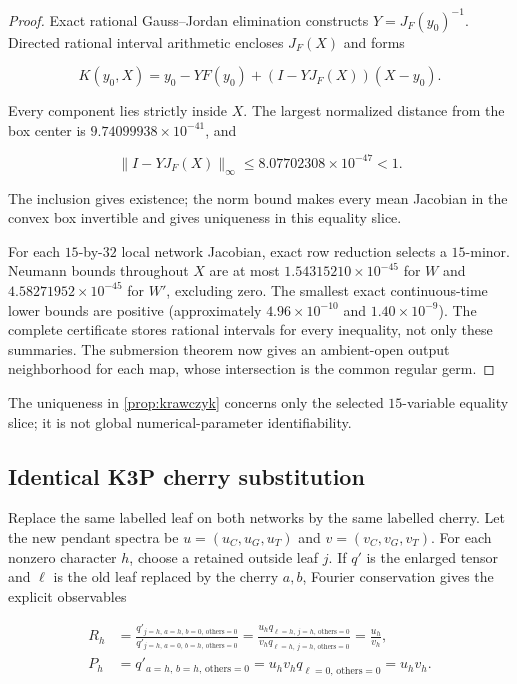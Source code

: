 \begin{proof}
Exact rational Gauss--Jordan elimination constructs
\(Y=J_F(y_0)^{-1}\).  Directed rational interval arithmetic encloses
\(J_F(X)\) and forms

\[
 K(y_0,X)=y_0-YF(y_0)+(I-YJ_F(X))(X-y_0).
\]

Every component lies strictly inside \(X\).  The largest normalized distance
from the box center is \(9.74099938\times10^{-41}\), and

\[
 \lVert I-YJ_F(X)\rVert_\infty
 \le8.07702308\times10^{-47}<1.
\]

The inclusion gives existence; the norm bound makes every mean Jacobian in
the convex box invertible and gives uniqueness in this equality slice.

For each \(15\)-by-\(32\) local network Jacobian, exact row reduction selects
a \(15\)-minor.  Neumann bounds throughout \(X\) are at most
\(1.54315210\times10^{-45}\) for \(W\) and
\(4.58271952\times10^{-45}\) for \(W'\), excluding zero.  The smallest exact
continuous-time lower bounds are positive (approximately
\(4.96\times10^{-10}\) and \(1.40\times10^{-9}\)).  The complete certificate
stores rational intervals for every inequality, not only these summaries.
The submersion theorem now gives an ambient-open output neighborhood for each
map, whose intersection is the common regular germ.
\end{proof}

The uniqueness in \cref{prop:krawczyk} concerns only the selected
\(15\)-variable equality slice; it is not global numerical-parameter
identifiability.

\subsection{Identical K3P cherry substitution}

Replace the same labelled leaf on both networks by the same labelled cherry.
Let the new pendant spectra be
\(u=(u_C,u_G,u_T)\) and \(v=(v_C,v_G,v_T)\).  For each nonzero character \(h\),
choose a retained outside leaf \(j\).  If \(q'\) is the enlarged tensor
and \(\ell\) is the old leaf replaced by the cherry \(a,b\), Fourier
conservation gives the explicit observables

\[
\begin{aligned}
R_h&=
\frac{q'_{j=h,\,a=h,\,b=0,\,\mathrm{others}=0}}
     {q'_{j=h,\,a=0,\,b=h,\,\mathrm{others}=0}}
=\frac{u_hq_{\ell=h,\,j=h,\,\mathrm{others}=0}}
       {v_hq_{\ell=h,\,j=h,\,\mathrm{others}=0}}
=\frac{u_h}{v_h},\\
P_h&=q'_{a=h,\,b=h,\,\mathrm{others}=0}
=u_hv_hq_{\ell=0,\,\mathrm{others}=0}=u_hv_h.
\end{aligned}
\]

